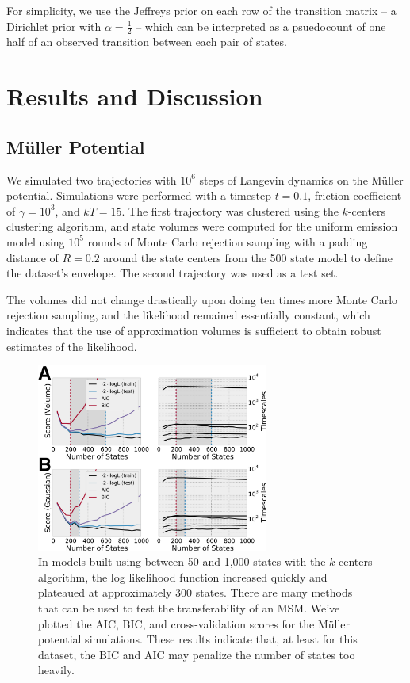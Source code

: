 \documentclass[twocolumn,floatfix,nofootinbib,aps]{revtex4-1}
\begin{document}
For simplicity, we use the Jeffreys prior on each row of the transition matrix -- a Dirichlet prior with $\alpha=\frac{1}{2}$ -- which can be interpreted as a psuedocount of one half of an observed transition between each pair of states.

\section{Results and Discussion}
\subsection{M\"{u}ller Potential}
We simulated two trajectories with $10^6$ steps of Langevin dynamics on the M\"{u}ller potential\cite{}. Simulations were performed with a timestep $t=0.1$, friction coefficient of $\gamma=10^3$, and $kT=15$. The first trajectory was clustered using the $k$-centers clustering algorithm, and state volumes were computed for the uniform emission model using $10^5$ rounds of Monte Carlo rejection sampling with a padding distance of $R=0.2$ around the state centers from the 500 state model to define the dataset's envelope. The second trajectory was used as a test set.

The volumes did not change drastically upon doing ten times more Monte Carlo rejection sampling, and the likelihood remained essentially constant, which indicates that the use of approximation volumes is sufficient to obtain robust estimates of the likelihood. 

\begin{figure}[h]
\centering
\includegraphics[width=3in]{figs_final/mull_likes.png}
\caption{In models built using between 50 and 1,000 states with the $k$-centers algorithm, the log likelihood function increased quickly and plateaued at approximately 300 states. There are many methods that can be used to test the transferability of an MSM. We've plotted the AIC, BIC, and cross-validation scores for the M\"uller potential simulations. These results indicate that, at least for this dataset, the BIC and AIC may penalize the number of states too heavily.}
\label{fig:mullerlike}
\end{figure}
\end{document}
